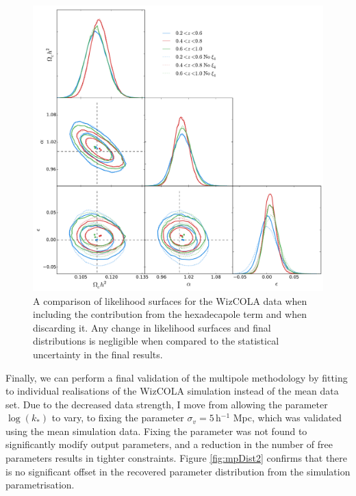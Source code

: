 \documentclass[titlesmallcaps, examinerscopy, copyrightpage]{uqthesis}
\begin{document}
\begin{figure}[h!]
  \begin{center}
    \includegraphics[width=\textwidth]{images/wizmpfastComp.pdf}
  \end{center}
  \caption{A comparison of likelihood surfaces for the WizCOLA data when including the contribution from the hexadecapole term and when discarding it. Any change in likelihood surfaces and final distributions is negligible when compared to the statistical uncertainty in the final results.}
  \label{fig:wizmpfastComp}
\end{figure}

Finally, we can perform a final validation of the multipole methodology by fitting to individual realisations of the WizCOLA simulation instead of the mean data set. Due to the decreased data strength, I move from allowing the parameter $\log(k_*)$ to vary, to fixing the parameter $\sigma_v = 5\,$h$^{-1}$ Mpc, which was validated using the mean simulation data. Fixing the parameter was not found to significantly modify output parameters, and a reduction in the number of free parameters results in tighter constraints. Figure \ref{fig:mpDist2} confirms that there is no significant offset in the recovered parameter distribution from the simulation parametrisation.
\end{document}
